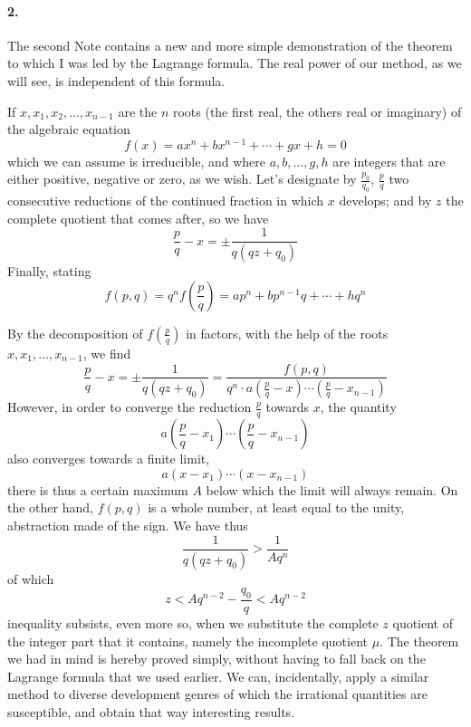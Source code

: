 \documentclass{article}
\begin{document}
\paragraph{2.}
The second Note contains a new and more simple demonstration of the theorem to
which I was led by the Lagrange formula. The real power of our method, as we
will see, is independent of this formula.
\begin{displayquote}
  If $x, x_1, x_2, \ldots, x_{n-1}$ are the $n$ roots (the first real, the others real or
  imaginary) of the algebraic equation
    $$f(x) = ax^n + bx^{n-1} + \cdots + gx + h = 0$$
  which we can assume is irreducible, and where $a, b, \ldots, g, h$ are
  integers that are either positive, negative or zero, as we wish. Let’s
  designate by $\frac{p_0}{q_0}$, $\frac{p}{q}$ two consecutive reductions of
  the continued fraction in which $x$ develops; and by $z$ the complete quotient
  that comes after, so we have
    $$\frac{p}{q} - x = \pm\frac{1}{q(qz + q_0)}$$
  Finally, stating
    $$f(p,q) = q^n f(\frac{p}{q}) = ap^n + bp^{n-1}q + \cdots + hq^n$$

  By the decomposition of $f(\frac{p}{q})$ in factors, with the help of the
  roots $x, x_1, \ldots, x_{n-1}$, we find
    $$\frac{p}{q} - x = \pm\frac{1}{q(qz+q_0)}
      = \frac{f(p,q)}{q^n\cdot a\left(\frac{p}{q}
      - x\right)\cdots\left(\frac{p}{q}-x_{n-1}\right)}$$
  However, in order to converge the reduction $\frac{p}{q}$ towards $x$, the
  quantity
    $$a\left(\frac{p}{q} - x_1\right)\cdots\left(\frac{p}{q} - x_{n-1}\right)$$
  also converges towards a finite limit,
    $$a(x-x_1)\cdots(x-x_{n-1})$$
  there is thus a certain maximum $A$ below which the limit will always remain.
  On the other hand, $f(p,q)$ is a whole number, at least equal to the unity,
  abstraction made of the sign. We have thus
    $$\frac{1}{q(qz+q_0)} > \frac{1}{Aq^n}$$
  of which
    $$z < Aq^{n-2} - \frac{q_0}{q} < Aq^{n-2}$$
  inequality subsists, even more so, when we substitute the complete $z$
  quotient of the integer part that it contains, namely the incomplete quotient
  $\mu$. The theorem we had in mind is hereby proved simply, without having to
  fall back on the Lagrange formula that we used earlier. We can, incidentally,
  apply a similar method to diverse development genres of which the irrational
  quantities are susceptible, and obtain that way interesting results.
\end{displayquote}
\end{document}
